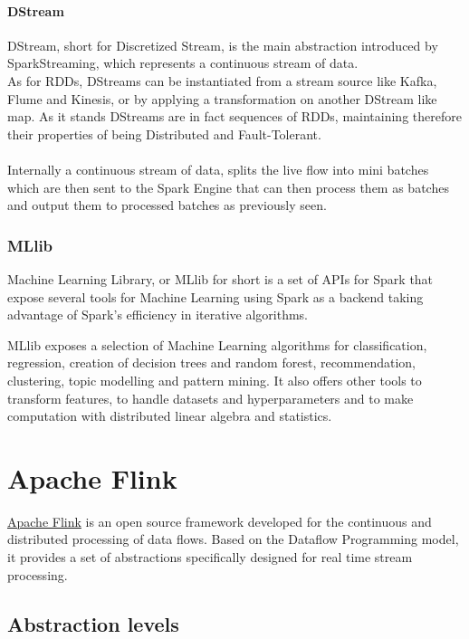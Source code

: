 \paragraph{DStream}

DStream, short for Discretized Stream, is the main abstraction introduced by SparkStreaming, which represents a continuous stream of data. \\
As for RDDs, DStreams can be instantiated from a stream source like Kafka, Flume and Kinesis, or by applying a transformation on another DStream like map. As it stands DStreams are in fact sequences of RDDs, maintaining therefore their properties of being Distributed and Fault-Tolerant.
\\ \\
Internally a continuous stream of data, splits the live flow into mini batches which are then sent to the Spark Engine that can then process them as batches and output them to processed batches as previously seen.

\subsubsection{MLlib}

Machine Learning Library, or MLlib for short is a set of APIs for Spark that expose several tools for Machine Learning using Spark as a backend taking advantage of Spark's efficiency in iterative algorithms.

MLlib exposes a selection of Machine Learning algorithms for classification, regression, creation of decision trees and random forest, recommendation, clustering, topic modelling and pattern mining.
It also offers other tools to transform features, to handle datasets and hyperparameters and to make computation with distributed linear algebra and statistics.

\pagebreak
\section{Apache Flink}\label{Flink}

\href{https://flink.apache.org/}{Apache Flink} is an open source framework developed for the continuous and distributed processing of data flows. Based on the Dataflow Programming model, it provides a set of abstractions specifically designed for real time stream processing.

\subsection{Abstraction levels}  \label{AbstractionLevels}

